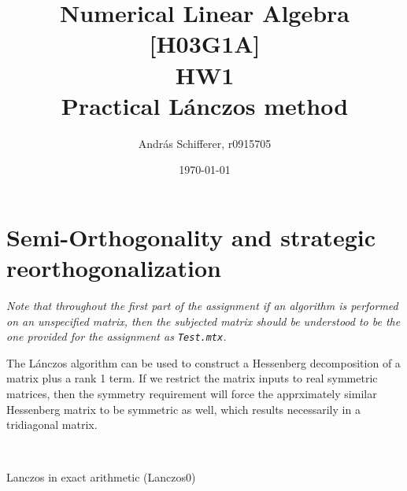 \documentclass{article}
\author{Andr\'as Schifferer, r0915705}
\title{Numerical Linear Algebra [H03G1A]\\{\LARGE HW1}\\{\large Practical L\'anczos method}}
\date{\today}
\begin{document}
	\maketitle
	\tableofcontents
	
	
	
	\newpage
	\section{Semi-Orthogonality and strategic reorthogonalization}
	\textit{Note that throughout the first part of the assignment if an algorithm is performed on an unspecified matrix, then the subjected matrix should be understood to be the one provided for the assignment as \texttt{Test.mtx}.
	}
	
	The Lánczos algorithm can be used to construct a Hessenberg decomposition of a matrix plus a rank 1 term. If we restrict the matrix inputs to real symmetric matrices, then the symmetry requirement will force the apprximately similar Hessenberg matrix to be symmetric as well, which results necessarily in a tridiagonal matrix.
	\begin{algorithm2e}[ht]
		
		\SetAlgoLined
		\\
		\caption{Lanczos in exact arithmetic (Lanczos0)}\label{alg:Lanczos0}
	\end{algorithm2e}\\
	
\end{document}
